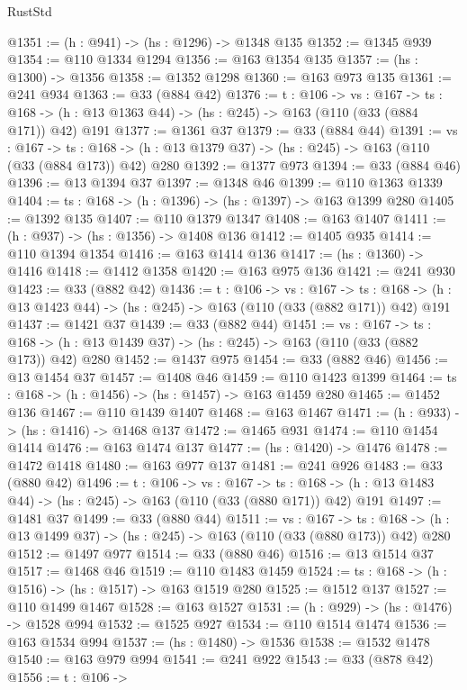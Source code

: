 \begin{lexlean}{RustStd}
\begin{coremodule}
@1351 := (h : @941) -> (hs : @1296) -> @1348 @135
@1352 := @1345 @939
@1354 := @110 @1334 @1294
@1356 := @163 @1354 @135
@1357 := (hs : @1300) -> @1356
@1358 := @1352 @1298
@1360 := @163 @973 @135
@1361 := @241 @934
@1363 := @33 (@884 @42)
@1376 := {t : @106} ->
  {vs : @167} ->
  {ts : @168} -> (h : @13 @1363 @44) -> (hs : @245) -> @163 (@110 (@33 (@884 @171)) @42) @191
@1377 := @1361 @37
@1379 := @33 (@884 @44)
@1391 := {vs : @167} ->
  {ts : @168} -> (h : @13 @1379 @37) -> (hs : @245) -> @163 (@110 (@33 (@884 @173)) @42) @280
@1392 := @1377 @973
@1394 := @33 (@884 @46)
@1396 := @13 @1394 @37
@1397 := @1348 @46
@1399 := @110 @1363 @1339
@1404 := {ts : @168} -> (h : @1396) -> (hs : @1397) -> @163 @1399 @280
@1405 := @1392 @135
@1407 := @110 @1379 @1347
@1408 := @163 @1407
@1411 := (h : @937) -> (hs : @1356) -> @1408 @136
@1412 := @1405 @935
@1414 := @110 @1394 @1354
@1416 := @163 @1414 @136
@1417 := (hs : @1360) -> @1416
@1418 := @1412 @1358
@1420 := @163 @975 @136
@1421 := @241 @930
@1423 := @33 (@882 @42)
@1436 := {t : @106} ->
  {vs : @167} ->
  {ts : @168} -> (h : @13 @1423 @44) -> (hs : @245) -> @163 (@110 (@33 (@882 @171)) @42) @191
@1437 := @1421 @37
@1439 := @33 (@882 @44)
@1451 := {vs : @167} ->
  {ts : @168} -> (h : @13 @1439 @37) -> (hs : @245) -> @163 (@110 (@33 (@882 @173)) @42) @280
@1452 := @1437 @975
@1454 := @33 (@882 @46)
@1456 := @13 @1454 @37
@1457 := @1408 @46
@1459 := @110 @1423 @1399
@1464 := {ts : @168} -> (h : @1456) -> (hs : @1457) -> @163 @1459 @280
@1465 := @1452 @136
@1467 := @110 @1439 @1407
@1468 := @163 @1467
@1471 := (h : @933) -> (hs : @1416) -> @1468 @137
@1472 := @1465 @931
@1474 := @110 @1454 @1414
@1476 := @163 @1474 @137
@1477 := (hs : @1420) -> @1476
@1478 := @1472 @1418
@1480 := @163 @977 @137
@1481 := @241 @926
@1483 := @33 (@880 @42)
@1496 := {t : @106} ->
  {vs : @167} ->
  {ts : @168} -> (h : @13 @1483 @44) -> (hs : @245) -> @163 (@110 (@33 (@880 @171)) @42) @191
@1497 := @1481 @37
@1499 := @33 (@880 @44)
@1511 := {vs : @167} ->
  {ts : @168} -> (h : @13 @1499 @37) -> (hs : @245) -> @163 (@110 (@33 (@880 @173)) @42) @280
@1512 := @1497 @977
@1514 := @33 (@880 @46)
@1516 := @13 @1514 @37
@1517 := @1468 @46
@1519 := @110 @1483 @1459
@1524 := {ts : @168} -> (h : @1516) -> (hs : @1517) -> @163 @1519 @280
@1525 := @1512 @137
@1527 := @110 @1499 @1467
@1528 := @163 @1527
@1531 := (h : @929) -> (hs : @1476) -> @1528 @994
@1532 := @1525 @927
@1534 := @110 @1514 @1474
@1536 := @163 @1534 @994
@1537 := (hs : @1480) -> @1536
@1538 := @1532 @1478
@1540 := @163 @979 @994
@1541 := @241 @922
@1543 := @33 (@878 @42)
@1556 := {t : @106} ->

\end{coremodule}
\end{lexlean}
